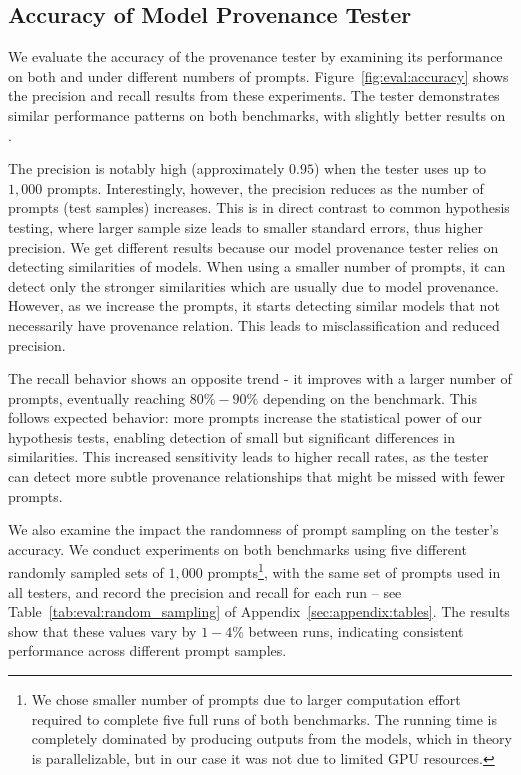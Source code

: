 

\subsection{Accuracy of Model Provenance Tester}
\label{sec:eval:basic}

We evaluate the accuracy of the provenance tester by examining its performance on both \bencho and \bencht under different numbers of prompts. 
Figure~\ref{fig:eval:accuracy} shows
the precision and recall results from these experiments. The tester demonstrates similar performance patterns on both benchmarks, with slightly better results on \bencho.

The precision is notably high (approximately $0.95$) when the tester uses up to $1,000$ prompts.
Interestingly, however, the precision reduces as the number of prompts (test samples) increases. This is in direct contrast to common hypothesis testing, where larger sample size leads to smaller standard errors, thus higher precision. 
We get different results because our model provenance tester relies on detecting similarities of models. When using a smaller number of prompts, it can detect only the stronger similarities which are usually due to model provenance. However, as we increase the prompts, it starts detecting similar models that not necessarily have provenance relation. This leads to misclassification and reduced precision.

The recall behavior shows an opposite trend - it improves with a larger number of prompts, eventually reaching $80\%-90\%$ depending on the benchmark. This follows expected behavior: more prompts increase the statistical power of our hypothesis tests, enabling detection of small but significant differences in similarities. This increased sensitivity leads to higher recall rates, as the tester can detect more subtle provenance relationships that might be missed with fewer prompts.

We also examine the impact the randomness of  prompt sampling on the tester's accuracy. We conduct experiments on both benchmarks using five different randomly sampled sets of $1,000$ prompts\footnote{We chose smaller number of prompts due to larger computation effort required to complete five full runs of both benchmarks. The running time is completely dominated by producing outputs from the models, which in theory is parallelizable, but in our case it was not due to limited GPU resources.}, with the same set of prompts used in all testers, and record the precision and recall for each run -- see Table~\ref{tab:eval:random_sampling} of Appendix~\ref{sec:appendix:tables}. The results show that these values vary by $1-4\%$ between runs, indicating consistent performance across different prompt samples.


